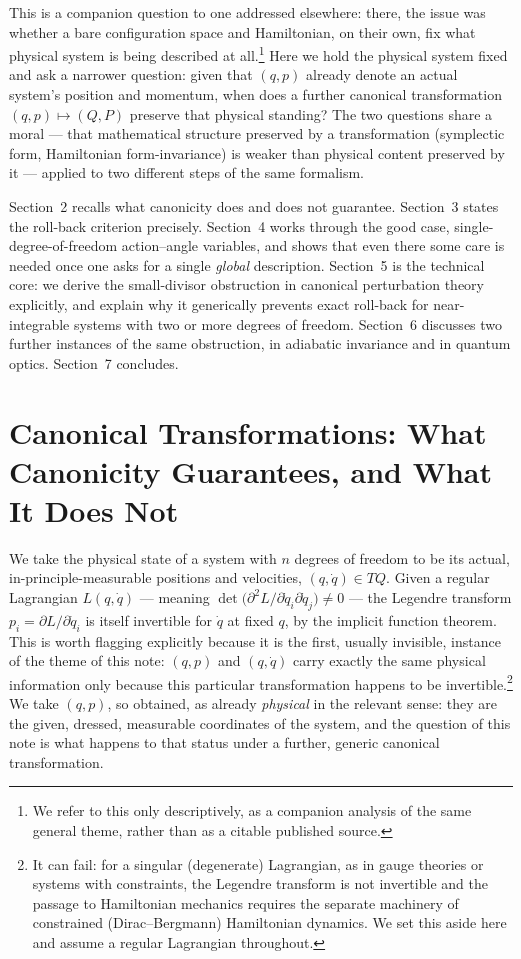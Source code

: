 \documentclass[11pt]{article}
\begin{document}
This is a companion question to one addressed elsewhere: there, the issue was whether a bare configuration space and Hamiltonian, on their own, fix what physical system is being described at all.\footnote{We refer to this only descriptively, as a companion analysis of the same general theme, rather than as a citable published source.} Here we hold the physical system fixed and ask a narrower question: given that $(q,p)$ already denote an actual system's position and momentum, when does a further canonical transformation $(q,p)\mapsto(Q,P)$ preserve that physical standing? The two questions share a moral --- that mathematical structure preserved by a transformation (symplectic form, Hamiltonian form-invariance) is weaker than physical content preserved by it --- applied to two different steps of the same formalism.

Section~2 recalls what canonicity does and does not guarantee. Section~3 states the roll-back criterion precisely. Section~4 works through the good case, single-degree-of-freedom action--angle variables, and shows that even there some care is needed once one asks for a single \emph{global} description. Section~5 is the technical core: we derive the small-divisor obstruction in canonical perturbation theory explicitly, and explain why it generically prevents exact roll-back for near-integrable systems with two or more degrees of freedom. Section~6 discusses two further instances of the same obstruction, in adiabatic invariance and in quantum optics. Section~7 concludes.

\section{Canonical Transformations: What Canonicity Guarantees, and What It Does Not}

We take the physical state of a system with $n$ degrees of freedom to be its actual, in-principle-measurable positions and velocities, $(q,\dot q)\in TQ$. Given a regular Lagrangian $L(q,\dot q)$ --- meaning $\det\!\big(\partial^2 L/\partial \dot q_i\partial \dot q_j\big)\neq0$ --- the Legendre transform $p_i=\partial L/\partial \dot q_i$ is itself invertible for $\dot q$ at fixed $q$, by the implicit function theorem. This is worth flagging explicitly because it is the first, usually invisible, instance of the theme of this note: $(q,p)$ and $(q,\dot q)$ carry exactly the same physical information only because this particular transformation happens to be invertible.\footnote{It can fail: for a singular (degenerate) Lagrangian, as in gauge theories or systems with constraints, the Legendre transform is not invertible and the passage to Hamiltonian mechanics requires the separate machinery of constrained (Dirac--Bergmann) Hamiltonian dynamics. We set this aside here and assume a regular Lagrangian throughout.} We take $(q,p)$, so obtained, as already \emph{physical} in the relevant sense: they are the given, dressed, measurable coordinates of the system, and the question of this note is what happens to that status under a further, generic canonical transformation.
\end{document}
